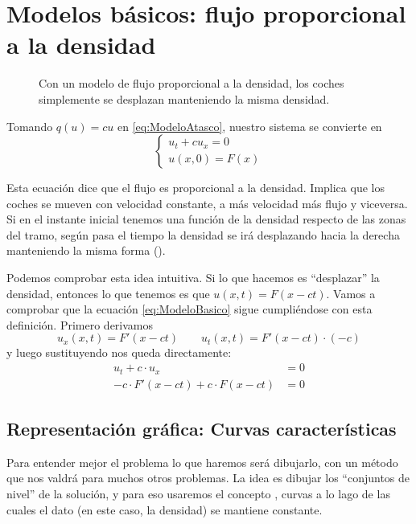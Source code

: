 	\section{Modelos básicos: flujo proporcional a la densidad}
	\label{sec:ModeloBasicoFlujoProporcional}

		\begin{figure}[hbtp]
		\centering
		\caption{Con un modelo de flujo proporcional a la densidad, los coches simplemente se desplazan manteniendo la misma densidad.}
		\label{fig:CochesModeloLineal}
		\end{figure}

		Tomando $q(u) = cu$ en \eqref{eq:ModeloAtasco}, nuestro sistema se convierte en
		\begin{equation}
		\left\{
		\begin{array}{l}
		u_t + cu_x = 0 \\
		u(x,0) = F(x)
		\end{array}
		\right. \label{eq:ModeloBasico}
		\end{equation}

		Esta ecuación dice que el flujo es proporcional a la densidad. Implica que los coches se mueven con velocidad constante, a más velocidad más flujo y viceversa. Si en el instante inicial tenemos una función de la densidad respecto de las zonas del tramo, según pasa el tiempo la densidad se irá desplazando hacia la derecha manteniendo la misma forma ().

		Podemos comprobar esta idea intuitiva. Si lo que hacemos es ``desplazar'' la densidad, entonces lo que tenemos es que $u(x,t) = F(x-ct)$. Vamos a comprobar que la ecuación \eqref{eq:ModeloBasico} sigue cumpliéndose con esta definición. Primero derivamos \[ u_x(x,t) = F'(x-ct) \qquad u_t(x,t) = F'(x-ct) · (-c) \] y luego sustituyendo nos queda directamente: \begin{align*}
			u_t + c·u_x &= 0 \\
			-c·F'(x-ct) + c·F(x-ct) &= 0
		\end{align*}

		\subsection{Representación gráfica: Curvas características}

			Para entender mejor el problema lo que haremos será dibujarlo, con un método que nos valdrá para muchos otros problemas. La idea es dibujar los ``conjuntos de nivel'' de la solución, y para eso usaremos el concepto , curvas a lo lago de las cuales el dato (en este caso, la densidad) se mantiene constante.

